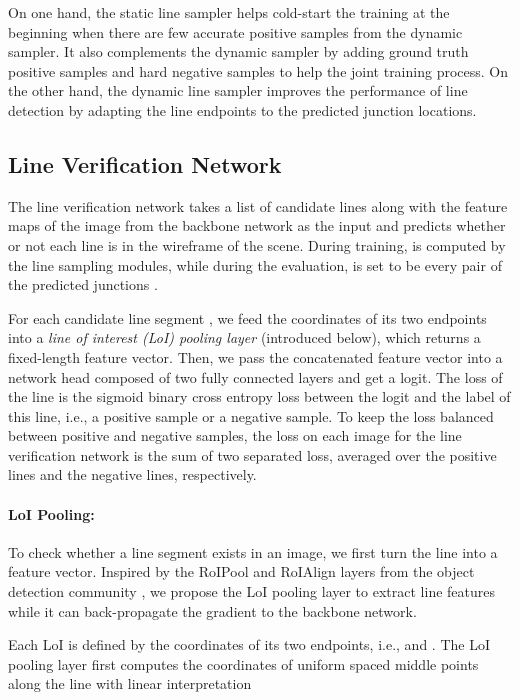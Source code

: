 \documentclass[10pt,twocolumn,letterpaper]{article}
\begin{document}
On one hand, the static line sampler helps cold-start the training at the beginning when there are few accurate positive samples from the dynamic sampler. It also complements the dynamic sampler by adding ground truth positive samples and hard negative samples to help the joint training process. On the other hand, the dynamic line sampler improves the performance of line detection by adapting the line endpoints to the predicted junction locations.

\subsection{Line Verification Network} \label{sec:verification}
The line verification network takes a list of candidate lines  along with the feature maps of the image from the backbone network as the input and predicts whether or not each line is in the wireframe of the scene. During training,  is computed by the line sampling modules, while during the evaluation,  is set to be every pair of the predicted junctions .

For each candidate line segment , we feed the coordinates of its two endpoints into a \emph{line of interest (LoI) pooling layer} (introduced below), which returns a fixed-length feature vector. Then, we pass the concatenated feature vector into a network head composed of two fully connected layers and get a logit. The loss of the line is the sigmoid binary cross entropy loss between the logit and the label of this line, i.e., a positive sample or a negative sample. To keep the loss balanced between positive and negative samples, the loss on each image for the line verification network is the sum of two separated loss, averaged over the positive lines and the negative lines, respectively.

\paragraph{LoI Pooling:} To check whether a line segment exists in an image, we first turn the line into a feature vector. Inspired by the RoIPool and RoIAlign layers from the object detection community \cite{girshick2014rich,girshick2015fast,ren2015faster,he2017mask}, we propose the LoI pooling layer to extract line features while it can back-propagate the gradient to the backbone network.

Each LoI is defined by the coordinates of its two endpoints, i.e.,   and .  The LoI pooling layer first computes the coordinates of  uniform spaced middle points along the line with linear interpretation
\end{document}
